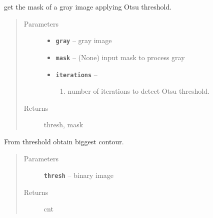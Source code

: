 \documentclass[letterpaper,10pt,english]{sphinxmanual}
\begin{document}

\begin{fulllineitems}
\label{RRtoolbox.lib.arrayops:RRtoolbox.lib.arrayops.mask.multiple_otsu}
get the mask of a gray image applying Otsu threshold.
\begin{quote}\begin{description}
\item[{Parameters}] \leavevmode\begin{itemize}
\item {} 
\textbf{\texttt{gray}} -- gray image

\item {} 
\textbf{\texttt{mask}} -- (None) input mask to process gray

\item {} 
\textbf{\texttt{iterations}} -- \begin{enumerate}
\item {} 
number of iterations to detect Otsu threshold.

\end{enumerate}


\end{itemize}

\item[{Returns}] \leavevmode
thresh, mask

\end{description}\end{quote}

\end{fulllineitems}


\begin{fulllineitems}
\label{RRtoolbox.lib.arrayops:RRtoolbox.lib.arrayops.mask.thresh_biggestCnt}
From threshold obtain biggest contour.
\begin{quote}\begin{description}
\item[{Parameters}] \leavevmode
\textbf{\texttt{thresh}} -- binary image

\item[{Returns}] \leavevmode
cnt

\end{description}\end{quote}

\end{fulllineitems}
\end{document}
